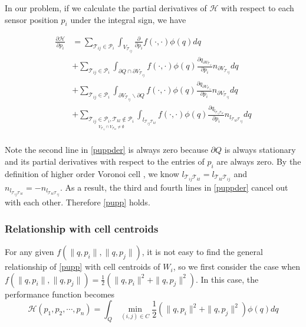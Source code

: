 \documentclass[letterpaper, 10 pt, conference]{ieeeconf}
\begin{document}
In our problem, if we calculate the partial derivatives of $\mathcal{H}$ with respect to each sensor position $p_i$ under the integral sign, we have


\begin{equation}\label{puppder}
\begin{split}
\frac{\partial \mathcal{H}}{\partial {p_i}}&=\sum_{\mathcal{T}_{ij}\in \mathcal{P}_i}
\int_{V_{\mathcal{T}_{ij}}}\frac{\partial}{\partial {p_i}}f(\cdot,\cdot) \phi(q) dq\\
&+\sum_{\mathcal{T}_{ij}\in \mathcal{P}_i}
\int_{\partial Q \cap \partial V_{\mathcal{T}_{ij}}} f(\cdot,\cdot) \phi(q) \frac{\partial q_{ \partial V_{\mathcal{T}_{ij}}}}{\partial p_i} n_{\partial V_{\mathcal{T}_{ij}}} dq\\
&+\sum_{\mathcal{T}_{ij}\in \mathcal{P}_i}
\int_{\partial V_{\mathcal{T}_{ij}} \backslash \partial Q} f(\cdot,\cdot) \phi(q) \frac{\partial q_{\partial V_{\mathcal{T}_{ij}}}}{\partial p_i} n_{\partial V_{\mathcal{T}_{ij}}} dq\\
&+\sum_{\underset{V_{\mathcal{T}_{ij}}\cap V_{\mathcal{T}_{kl}}\neq \emptyset}{\mathcal{T}_{ij}\in \mathcal{P}_i,\mathcal{T}_{kl}\not\in \mathcal{P}_i}}
\int_{l_{\mathcal{T}_{ij}\mathcal{T}_{kl}}} f(\cdot,\cdot) \phi(q) \frac{\partial q_{l_{\mathcal{T}_{ij}\mathcal{T}_{kl}}}}{\partial p_i} n_{l_{\mathcal{T}_{kl}\mathcal{T}_{ij}}} dq\\
\end{split}
\end{equation}

Note the second line in \eqref{puppder} is always zero because $\partial Q$ is always stationary and its partial derivatives with respect to the entries of $p_i$ are always zero. By the definition of higher order Voronoi cell \cite{shamos1975closest}, we know $l_{\mathcal{T}_{ij}\mathcal{T}_{kl}}=l_{\mathcal{T}_{kl}\mathcal{T}_{ij}}$ and $n_{l_{\mathcal{T}_{ij}\mathcal{T}_{kl}}}=-n_{l_{\mathcal{T}_{kl}\mathcal{T}_{ij}}}$. As a result, the third and fourth lines in \eqref{puppder} cancel out with each other. Therefore \eqref{pupp} holds.

\subsubsection{Relationship with cell centroids}

For any given $f(\|q,p_i\|,\|q,p_j\|)$, it is not easy to find the general relationship of \eqref{pupp} with cell centroids of $W_i$, so we first consider the case when
$f(\|q,p_i\|,\|q,p_j\|)=\frac{1}{2}(\|q,p_i\|^2 + \|q,p_j\|^2)$. In this case, the performance function becomes $$\mathcal{H}(p_1, p_2,\cdots,p_n)=\int_Q \min_{(i,j)\in C} \frac{1}{2}(\|q,p_i\|^2 + \|q,p_j\|^2) \phi(q) dq$$
\end{document}
